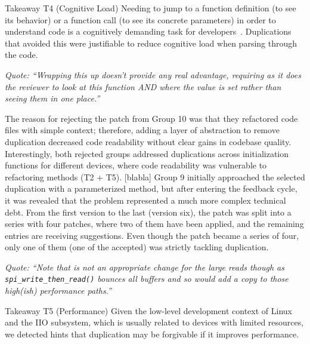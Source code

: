 \documentclass[sigconf]{acmart}
\newenvironment{highlight-box}[1]{%
  \begin{framed}%
  \noindent\textbf{#1:} \itshape\ignorespaces}{%
  \end{framed}}
\begin{document}
\begin{highlight-box}{Takeaway T4 (Cognitive Load)}
  Needing to jump to a function definition (to see its behavior) or a function
  call (to see its concrete parameters) in order to understand code is a
  cognitively demanding task for developers~\cite{questions-programmers-ask}.
  Duplications that avoided this were justifiable to reduce cognitive load when
  parsing through the code.
\hfill\\

\noindent
\begin{footnotesize}
\textit{
  Quote: ``Wrapping this up doesn't provide any real advantage, requiring as
  it does the reviewer to look at this function AND where the value is set
  rather than seeing them in one place.''
}
\end{footnotesize}
\end{highlight-box}

The reason for rejecting the patch from Group 10 was that they refactored code files with simple context; therefore, adding a layer of abstraction to remove duplication decreased code readability without clear gains in codebase quality. Interestingly, both rejected groups addressed duplications across initialization functions for different devices, where code readability was vulnerable to refactoring methods (T2  + T5). [blabla] Group 9 initially approached the selected duplication with a parameterized method, but after entering the feedback cycle, it was revealed that the problem represented a much more complex technical debt. From the first version to the last (version six), the patch was split into a series with four patches, where two of them have been applied, and the remaining entries are receiving suggestions. Even though the patch became a series of four, only one of them (one of the accepted) was strictly tackling duplication.

\noindent
\begin{footnotesize}
\textit{
  Quote: ``Note that is not an appropriate change for the large reads though
  as \texttt{spi\_write\_then\_read()} bounces all buffers and so would add a
  copy to those high(ish) performance paths.''
}
\end{footnotesize}

\begin{highlight-box}{Takeaway T5 (Performance)}
  Given the low-level development context of Linux and the IIO subsystem, which
  is usually related to devices with limited resources, we detected hints that
  duplication may be forgivable if it improves performance.
\hfill\\
\end{highlight-box}
\end{document}
